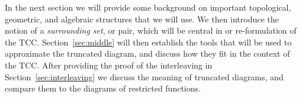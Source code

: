 In the next section we will provide some background on important topological, geometric, and algebraic structures that we will use.
We then introduce the notion of a \emph{surrounding set}, or pair, which will be central in or re-formulation of the TCC.
Section~\ref{sec:middle} will then establish the tools that will be used to approximate the truncated diagram, and discuss how they fit in the context of the TCC.
After providing the proof of the interleaving in Section~\ref{sec:interleaving} we discuss the meaning of truncated diagrams, and compare them to the diagrams of restricted functions.
